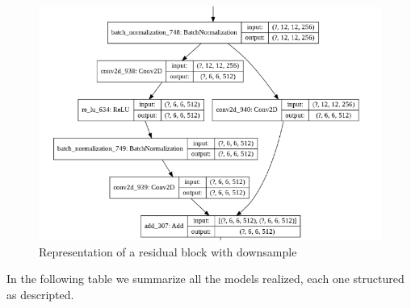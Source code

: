 \documentclass[10pt,twocolumn,letterpaper]{article}
\begin{document}
\begin{figure}[H]
   \includegraphics[width=0.8\linewidth]{./immagini/residual_dotted.png}
   \caption{Representation of a residual block with downsample}
\end{figure}
\noindent In the following table we summarize all the models realized, each one structured as descripted.
\def\arraystretch{1.2}
\end{document}
